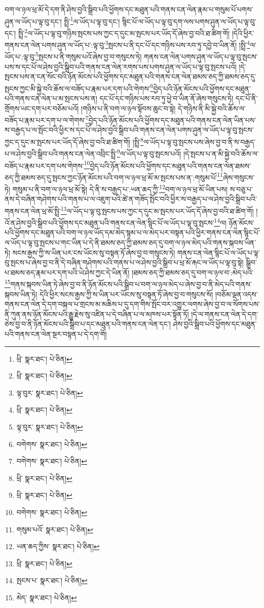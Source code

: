 བག་ལ་ཉལ་ཕྲ་མོ་དེ་དག་ནི་ཤེས་བྱའི་སྒྲིབ་པའི་ཕྱོགས་དང་མཐུན་པའི་གནས་ངན་ལེན་རྣམ་པ་གསུམ་པོ་པགས་ཤུན་ལ་ཡོད་པ་ལྟ་བུ་དང་། སྤྲི་\footnote{ཕྲི་  སྣར་ཐང་།  པེ་ཅིན། }ལ་ཡོད་པ་ལྟ་བུ་དང་། སྙིང་པོ་ལ་ཡོད་པ་ལྟ་བུ་དག་ལས་པགས་ཤུན་ལ་ཡོད་པ་ལྟ་བུ་དང་། སྤྲི་\footnote{ཕྲི་  སྣར་ཐང་།  པེ་ཅིན། }ལ་ཡོད་པ་ལྟ་བུ་གཉིས་སྤངས་པས་ཀྱང་ད་དུང་མ་སྤངས་པར་ཡོད་དོ་ཞེས་བྱ་བའི་ཐ་ཚིག་གོ། །དེའི་ཕྱིར་གནས་ངན་ལེན་པགས་ཤུན་ལ་ཡོད་པ་:ལྟ་བུ་\footnote{ལྟ་བུར་  སྣར་ཐང་།  པེ་ཅིན། }སྤངས་པ་ནི་དང་པོ་དང་གཉིས་པས་རབ་ཏུ་དབྱེ་བ་ཡིན་ནོ། །སྤྲི་\footnote{ཕྲི་  སྣར་ཐང་།  པེ་ཅིན། }ལ་ཡོད་པ་:ལྟ་བུ་\footnote{ལྟ་བུར་  སྣར་ཐང་།  པེ་ཅིན། }སྤངས་པ་ནི་གསུམ་པའོ་ཞེས་བྱ་བ་གསུངས་ཏེ། གནས་ངན་ལེན་པགས་ཤུན་ལ་ཡོད་པ་ལྟ་བུ་སྤངས་པས་ས་དང་པོ་ལ་ཤེས་བྱའི་སྒྲིབ་པའི་གནས་ངན་ལེན་རགས་པས་པགས་ཤུན་ལ་ཡོད་པ་ལྟ་བུ་སྤངས་པའོ། །དེ་སྤངས་པས་ན་ངན་སོང་བའི་ཉོན་མོངས་པའི་ཕྱོགས་དང་མཐུན་པའི་གནས་ངན་ལེན་ཐམས་ཅད་ཀྱི་ཐམས་ཅད་དུ་སྤངས་ཀྱང་མི་སྐྱེ་བའི་ཆོས་ལ་བཟོད་པ་རྣམ་པར་དག་པའི་གེགས་\footnote{བགེགས་  སྣར་ཐང་།  པེ་ཅིན། }བྱེད་པའི་ཉོན་མོངས་པའི་ཕྱོགས་དང་མཐུན་པའི་གནས་ངན་ལེན་པ་མ་སྤངས་པས་ན། དང་པོ་དང་གཉིས་པས་རབ་ཏུ་ཕྱེ་བ་ཡིན་ནོ་ཞེས་གསུངས་ཏེ། དང་པོ་ནི་གྲོགས་ཡང་དག་པར་བཅོམ་པའོ། །གཉིས་པ་ནི་བག་ལ་ཉལ་སྟོབས་ཆུང་བ་སྟེ། དེ་གཉིས་ནི་མི་སྐྱེ་བའི་ཆོས་ལ་བཟོད་པ་རྣམ་པར་དག་པ་ལ་གེགས་\footnote{བགེགས་  སྣར་ཐང་།  པེ་ཅིན། }བྱེད་པའི་ཉོན་མོངས་པའི་ཕྱོགས་དང་མཐུན་པའི་གནས་ངན་ལེན་ཡིན་པས་ས་བརྒྱད་པ་ལ་སྤོང་བའི་ཕྱིར་ས་དང་པོ་ལ་ཤེས་བྱའི་སྒྲིབ་པའི་གནས་ངན་ལེན་པགས་ཤུན་ལ་ཡོད་པ་ལྟ་བུ་སྤངས་ཀྱང་ད་དུང་མ་སྤངས་པར་ཡོད་དོ་ཞེས་བྱ་བའི་ཐ་ཚིག་གོ། །སྤྲི་\footnote{ཕྲི་  སྣར་ཐང་།  པེ་ཅིན། }ལ་ཡོད་པ་ལྟ་བུ་སྤངས་པས་ཞེས་བྱ་བ་ནི་ས་བརྒྱད་པ་ལ་ཤེས་བྱའི་སྒྲིབ་པའི་གནས་ངན་ལེན་འབྲིང་སྤྲི་\footnote{ཕྲི་  སྣར་ཐང་།  པེ་ཅིན། }ལ་ཡོད་པ་ལྟ་བུ་སྤངས་པའོ། །དེ་སྤངས་པ་ན་མི་སྐྱེ་བའི་ཆོས་ལ་བཟོད་པ་རྣམ་པར་དག་པས་གེགས་\footnote{བགེགས་  སྣར་ཐང་།  པེ་ཅིན། }བྱེད་པའི་ཉོན་མོངས་པའི་ཕྱོགས་དང་མཐུན་པའི་གནས་ངན་ལེན་ཐམས་ཅད་ཀྱི་ཐམས་ཅད་དུ་སྤངས་ཀྱང་ཉོན་མོངས་པའི་བག་ལ་ཉལ་ཕྲ་མོ་མ་སྤངས་པས་ན་:གསུམ་པོ་\footnote{གསུམ་པའོ་  སྣར་ཐང་།  པེ་ཅིན། }ཞེས་གསུངས་ཏེ། གསུམ་པ་ནི་བག་ལ་ཉལ་ཕྲ་མོ་སྟེ། དེ་ནི་ས་བརྒྱད་པ་:ཡན་ཆད་ཀྱི་\footnote{ཡན་ཆད་ཀྱིས་  སྣར་ཐང་།  པེ་ཅིན། }བག་ལ་ཉལ་ཕྲ་མོ་ཡིན་པས། ས་བཅུ་པ་ནས་དེ་བཞིན་གཤེགས་པའི་གནས་པ་ལ་འཇུག་པའི་ཚེ་ན་གཟོད་སྤོང་བའི་ཕྱིར་ས་བརྒྱད་པ་ལ་ཤེས་བྱའི་སྒྲིབ་པའི་གནས་ངན་ལེན་ཕྲ་མོ་སྤྲི་\footnote{ཕྲི་  སྣར་ཐང་།  པེ་ཅིན། }ལ་ཡོད་པ་ལྟ་བུ་སྤངས་པས་ཀྱང་ད་དུང་མ་སྤངས་པར་ཡོད་དོ་ཞེས་བྱ་བའི་ཐ་ཚིག་གོ། །འོ་ན་ཤེས་བྱའི་སྒྲིབ་པའི་ཕྱོགས་དང་མཐུན་པའི་གནས་ངན་ལེན་སྙིང་པོ་ལ་ཡོད་པ་ལྟ་བུ་སྤངས་\footnote{སྤངས་པ་  སྣར་ཐང་།  པེ་ཅིན། }ལ། ཉོན་མོངས་པའི་ཕྱོགས་དང་མཐུན་པའི་བག་ལ་ཉལ་ཡོད་དམ་མེད་སྙམ་པ་ལ་མེད་པར་བསྟན་པའི་ཕྱིར་གནས་ངན་ལེན་སྙིང་པོ་ལ་ཡོད་པ་ལྟ་བུ་སྤངས་པ་གང་ཡིན་པ་དེ་ནི་ཐམས་ཅད་ཀྱི་ཐམས་ཅད་དུ་བག་ལ་ཉལ་མེད་པའི་གནས་སྐབས་ཡིན་ཏེ། སངས་རྒྱས་ཀྱི་ས་ཡིན་པར་ངས་ཡོངས་སུ་བསྟན་ཏོ་ཞེས་བྱ་བ་གསུངས་ཏེ། གནས་ངན་ལེན་སྙིང་པོ་ལ་ཡོད་པ་ལྟ་བུ་སྤངས་པ་ཞེས་བྱ་བ་ནི་དེ་བཞིན་གཤེགས་པའི་གནས་པ་ལ་ཤེས་བྱའི་སྒྲིབ་པ་ཕྲ་མོ་རྐང་ལ་ཡོད་པ་ལྟ་བུ་སྟེ། སྒྲིབ་པ་ཐམས་ཅད་རྣམ་པར་དག་པའི་ཡེ་ཤེས་ཀྱང་དེ་ཡིན་ནོ། །ཐམས་ཅད་ཀྱི་ཐམས་ཅད་དུ་བག་ལ་ཉལ་བ་:མེད་པའི་\footnote{མེད་  སྣར་ཐང་།  པེ་ཅིན། }གནས་སྐབས་ཡིན་ཏེ་ཞེས་བྱ་བ་ནི་ཉོན་མོངས་པའི་སྒྲིབ་པ་བག་ལ་ཉལ་མེད་པ་ཞེས་བྱ་བ་ནི་མེད་པའི་གནས་སྐབས་ཡིན་ཏེ། དེའི་ཕྱིར་སངས་རྒྱས་ཀྱི་ས་ཡིན་པར་ཡོངས་སུ་བསྟན་ཏོ་ཞེས་བྱ་བ་གསུངས་སོ། །བཅོམ་ལྡན་འདས་གནས་ངན་ལེན་དེ་དག་བསྐལ་པ་གྲངས་མ་མཆིས་པ་དུ་དག་གིས་སྤོང་བར་འགྱུར་ལགས་ཞེས་བྱ་བ་ལ་སོགས་པས་ནི་ཀུན་ནས་ཉོན་མོངས་པའི་རྒྱུ་རྗེས་སུ་འཛིན་པ་དེ་བཞིན་པ་ལ་མཁས་པར་སྟོན་ཏོ། །དེ་ལ་གནས་ངན་ལེན་དེ་དག་ཅེས་བྱ་བ་ནི་ཉོན་མོངས་པའི་སྒྲིབ་པ་དང་མཐུན་པའི་གནས་ངན་ལེན་དང་། ཤེས་བྱའི་སྒྲིབ་པའི་ཕྱོགས་དང་མཐུན་པའི་གནས་ངན་ལེན་སྔར་བསྟན་པ་དེ་དག་གོ། 